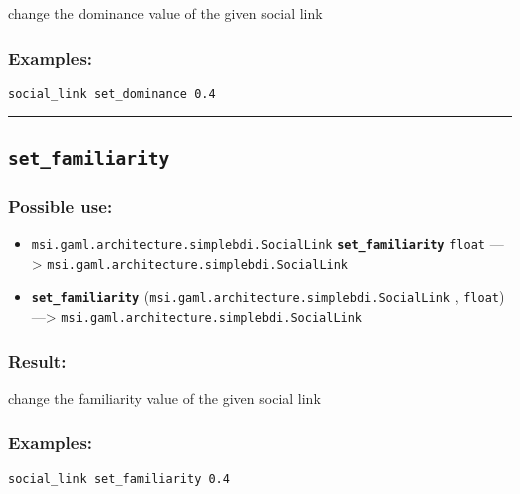\documentclass[]{book}
\providecommand{\tightlist}{%
  \setlength{\itemsep}{0pt}\setlength{\parskip}{0pt}}
\theoremstyle{definition}
\theoremstyle{definition}
\theoremstyle{definition}
\theoremstyle{remark}
\begin{document}
change the dominance value of the given social link

\subsubsection{Examples:}\label{examples-315}

\begin{verbatim}
social_link set_dominance 0.4 
\end{verbatim}

\begin{center}\rule{0.5\linewidth}{\linethickness}\end{center}

\subsection{\texorpdfstring{\texttt{set\_familiarity}}{set\_familiarity}}\label{set_familiarity}

\subsubsection{Possible use:}\label{possible-use-459}

\begin{itemize}
\tightlist
\item
  \texttt{msi.gaml.architecture.simplebdi.SocialLink}
  \textbf{\texttt{set\_familiarity}} \texttt{float} ---\textgreater{}
  \texttt{msi.gaml.architecture.simplebdi.SocialLink}
\item
  \textbf{\texttt{set\_familiarity}}
  (\texttt{msi.gaml.architecture.simplebdi.SocialLink} , \texttt{float})
  ---\textgreater{} \texttt{msi.gaml.architecture.simplebdi.SocialLink}
\end{itemize}

\subsubsection{Result:}\label{result-443}

change the familiarity value of the given social link

\subsubsection{Examples:}\label{examples-316}

\begin{verbatim}
social_link set_familiarity 0.4 
\end{verbatim}
\end{document}
